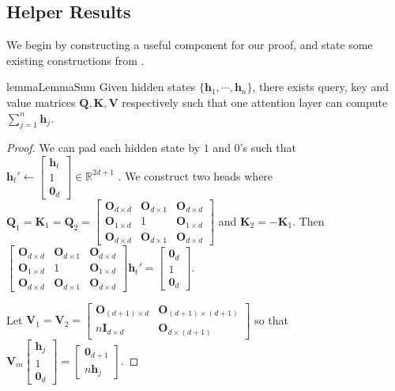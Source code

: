\documentclass[11pt]{article}
\theoremstyle{plain}
\theoremstyle{definition}
\theoremstyle{remark}
\newcommand{\zero}{\boldsymbol{0}}
\renewcommand{\^}[1]{^{(#1)}}
\newcommand{\bh}{\boldsymbol{h}}
\newcommand{\bK}{\boldsymbol{K}}
\newcommand{\bO}{\boldsymbol{O}}
\newcommand{\bQ}{\boldsymbol{Q}}
\newcommand{\bI}{\boldsymbol{I}}
\newcommand{\bV}{\boldsymbol{V}}
\begin{document}
\subsection{Helper Results}

We begin by constructing a useful component for our proof, and state some existing constructions from \citet{Akyrek2022WhatLA}.

\begin{restatable}{lemma}{LemmaSum} \label{lemma:sum}
    Given hidden states $\{\bh_1, \cdots, \bh_n\}$, there exists query, key and value matrices $\bQ, \bK, \bV$ respectively such that one attention layer can compute $\sum_{j=1}^n \bh_j$. 
\end{restatable}
\begin{proof}
We can pad each hidden state by $1$ and $0$'s such that $\bh_t' \leftarrow \begin{bmatrix}
    \bh_t \\ 1 \\ \zero_d
\end{bmatrix} \in \mathbb R^{2d+1}$ . We construct two heads where $\bQ_1 = \bK_1 = \bQ_2 = \begin{bmatrix}
    \bO_{d \times d} & \bO_{d \times 1} & \bO_{d \times d}\\
    \bO_{1 \times d} & 1  & \bO_{1 \times d} \\
    \bO_{d \times d} & \bO_{d \times 1} & \bO_{d \times d}
\end{bmatrix}$ and $\bK_2 = -\bK_1$. Then $\begin{bmatrix}
    \bO_{d \times d} & \bO_{d \times 1} & \bO_{d \times d}\\
    \bO_{1 \times d} & 1  & \bO_{1 \times d} \\
    \bO_{d \times d} & \bO_{d \times 1} & \bO_{d \times d}
\end{bmatrix} \bh_t' = \begin{bmatrix}
    \zero_d \\ 1 \\ \zero_d
\end{bmatrix}$.

Let $\bV_1 = \bV_2 = \begin{bmatrix}
    \bO_{(d+1) \times d} & \bO_{(d+1) \times (d+1)} \\
    n\bI_{d \times d}  &  \bO_{d \times (d+1)}
\end{bmatrix}$ so that $\bV_m \begin{bmatrix}
    \bh_j \\ 1 \\ \zero_d
\end{bmatrix} = \begin{bmatrix}
    \zero_{d+1} \\ n \bh_j 
\end{bmatrix}$. 


\end{proof}
\end{document}
